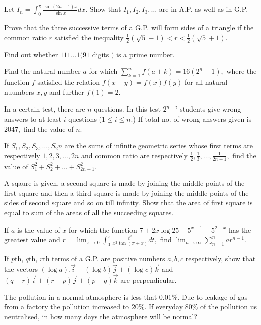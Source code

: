 \item Let $\displaystyle I_n = \int_0^\pi \frac{\sin(2n - 1)x}{\sin x}dx.$ Show that $I_1, I_2, I_3, \ldots$ are in A.P. as well as in
  G.P.
\item Prove that the three successive terms of a G.P. will form sides of a triangle if the common ratio $r$ satisfied the
  inequality $\frac{1}{2}(\sqrt{5} - 1) < r < \frac{1}{2}(\sqrt{5} + 1)$.
\item Find out whether $111\ldots1( 91$ digits $)$ is a prime number.
\item Find the natural number $a$ for which $\displaystyle\sum_{k = 1}^nf(a + k) = 16(2^n - 1),$ where the function $f$ satisfied the
  relation $f(x + y) = f(x)f(y)$ for all natural nuumbers $x, y$ and further $f(1) = 2$.
\item In a certain test, there are $n$ questions. In this test $2^{n - i}$ students give wrong answers to at least $i$
  questions ($1\leq i \leq n.$) If total no. of wrong answers given is $2047,$ find the value of $n$.
\item If $S_1, S_2, S_3, \ldots, S_2n$ are the sums of infinite geometric series whose first terms are respectively $1, 2,
  3, \ldots, 2n$ and common ratio are respectively $\frac{1}{2}, \frac{1}{3}, \ldots, \frac{1}{2n + 1},$ find the value of $S_1^2 +
  S_2^2 + \ldots + S_{2n - 1}^2$.
\item A sqaure is given, a second square is made by joining the middle points of the first square and then a third square
  is made by joining the middle points of the sides of second square and so on till infinity. Show that the area of first square is
  equal to sum of the areas of all the succeeding squares.
\item If $a$ is the value of $x$ for which the function $7 + 2x\log 25 - 5^{x - 1} - 5^{2 - x}$ has the greatest value and
  $r = \displaystyle\lim_{x\to 0}\int_{0}^x\frac{t^2}{x^2\tan(\pi + x)}dt,$ find $\displaystyle\lim_{n \to \infty}\sum_{n =
  1}^nar^{n - 1}$.
\item If $p$th, $q$th, $r$th terms of a G.P. are positive numbers $a, b, c$ respectively, show that the vectors $(\log
  a).\vec{i} + (\log b)\vec{j} + (\log c)\vec{k}$ and $(q - r)\vec{i} + (r - p)\vec{j} + (p - q)\vec{k}$ are perpendicular.
\item The pollution in a normal atmosphere is less that $0.01\%.$ Due to leakage of gas from a factory the pollution
  increased to $20\%.$ If everyday $80\%$ of the pollution us neutralised, in how many days the atmosphere will be normal?
